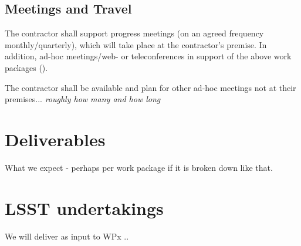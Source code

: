 \subsection{Meetings and Travel}
         {      \label{req:mngt:pm}
The contractor shall support progress meetings (on an agreed frequency monthly/quarterly), which will take
place at the contractor’s premise. In addition, ad-hoc meetings/web- or teleconferences in
support of the above work packages ().
}

         {      \label{req:mngt:pm}
The contractor shall be available and plan for other ad-hoc meetings  not at their premises... {\em roughly how many and how long }
}

\section{Deliverables}
What we expect - perhaps per work package if it is broken down like that.


\section{LSST undertakings}
We will deliver as input to WPx ..

